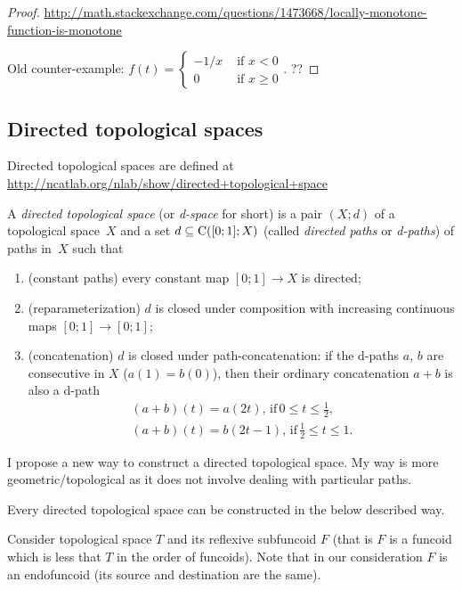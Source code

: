 \begin{proof}
\url{http://math.stackexchange.com/questions/1473668/locally-monotone-function-is-monotone}

Old counter-example: $f(t) = \begin{cases}-1/x&\text{ if }x<0\\0&\text{ if }x\ge 0\end{cases}$.
??
\end{proof}

\subsection{Directed topological spaces}

Directed topological spaces are defined at\\
\url{http://ncatlab.org/nlab/show/directed+topological+space}

\begin{defn}
A \emph{directed topological space} (or \emph{d-space} for short) is a pair $(X;d)$ of a topological space~$X$ and
a set $d\subseteq\mathrm{C}([0;1];X)$ (called \emph{directed paths} or \emph{d-paths}) of paths in~$X$ such that
\begin{enumerate}
\item (constant paths) every constant map $[0;1]\to X$ is directed;
\item (reparameterization) $d$ is closed under composition with increasing continuous maps $[0;1]\to [0;1]$;
\item (concatenation) $d$ is closed under path-concatenation: if the d-paths $a$, $b$ are consecutive in $X$ ($a(1)=b(0)$), then their ordinary concatenation $a+b$ is also a d-path
\begin{gather*}
(a+b)(t) = a(2t),\,\text{if}\, 0\le t\le \frac{1}{2}, \\
(a+b)(t) = b(2t-1),\,\text{if}\, \frac{1}{2}\le t\le 1.
\end{gather*}
\end{enumerate}
\end{defn}

I propose a new way to construct a directed topological space. My way is more geometric/topological as it does not involve dealing with particular paths.

\begin{conjecture}
Every directed topological space can be constructed in the below described way.
\end{conjecture}

Consider topological space $T$ and its reflexive subfuncoid $F$ (that is $F$ is a funcoid which is less that $T$ in the order of funcoids).
Note that in our consideration $F$ is an endofuncoid (its source and destination are the same).

